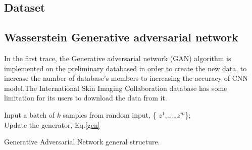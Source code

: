 \documentclass[conference]{IEEEtran}
\begin{document}
\subsection{Dataset}

\subsection{Wasserstein Generative adversarial network}
In the first trace, the Generative adversarial network (GAN) algorithm is implemented on the preliminary databased in order to create the new data, to increase the number of database's members to increasing the accuracy of CNN model.The International Skin Imaging Collaboration database has some limitation for its users to download the data from it.

\begin{algorithm}[H]
 {
    Input a batch of $k$ samples from random input, \{ $z^{1}, . . . ,    z^{m}$\};\\
    Update the generator, Eq.\ref{gen}
  }
  
 \caption{Generative Adversarial Network general structure.}
\end{algorithm}
\end{document}
